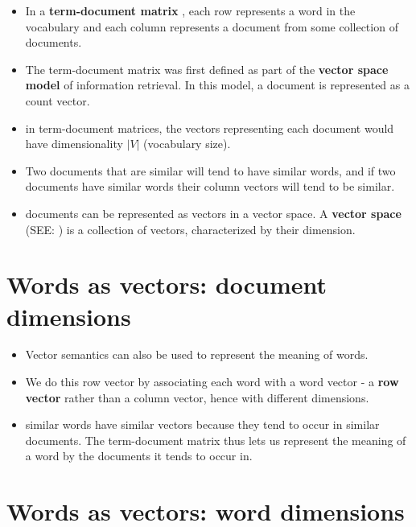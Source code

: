 \begin{itemize}
    \item In a \textbf{term-document matrix} \label{term-document matrix}, each row represents a word in the vocabulary and each column represents a document from some collection of documents.
    
    \item The term-document matrix was first defined as part of the \textbf{vector space model}\label{vector space model} of information retrieval. In this model, a document is represented as a count vector.

    \item in term-document matrices, the vectors representing each document would have dimensionality $|V|$ (vocabulary size).

    \item Two documents that are similar will tend to have similar words, and if two documents have similar words their column vectors will tend to be similar.

    \item documents can be represented as vectors in a vector space. A \textbf{vector space} (SEE: ) is a collection of vectors, characterized by their dimension.
\end{itemize}

\section{Words as vectors: document dimensions \cite{nlp-1}}\label{tf-idf: Words as vectors: document dimensions}

\begin{itemize}
    \item Vector semantics can also be used to represent the meaning of words. 

    \item We do this row vector by associating each word with a word vector - a \textbf{row vector} rather than a column vector, hence with different dimensions.

    \item similar words have similar vectors because they tend to occur in similar documents. The term-document matrix thus lets us represent the meaning of a word by the documents it tends to occur in.
\end{itemize}


\section{Words as vectors: word dimensions \cite{nlp-1}} \label{tf-idf: Words as vectors: word dimensions}


